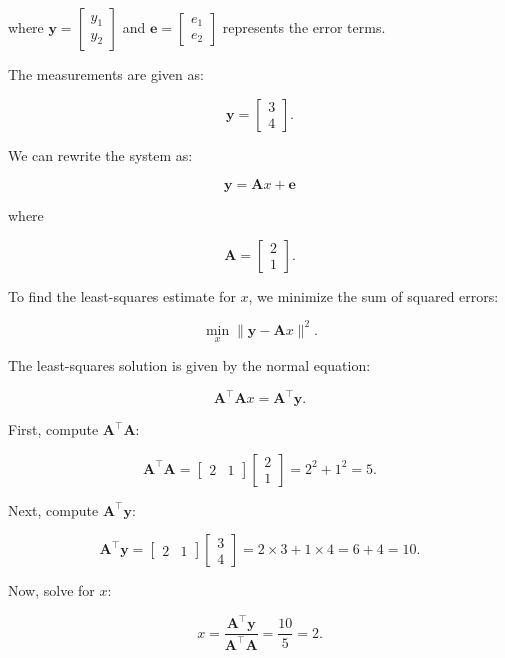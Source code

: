 \documentclass{article}
\begin{document}
where \( \mathbf{y} = \begin{bmatrix} y_1 \\ y_2 \end{bmatrix} \) and \( \mathbf{e} = \begin{bmatrix} e_1 \\ e_2 \end{bmatrix} \) represents the error terms.

The measurements are given as:

\[
\mathbf{y} = \begin{bmatrix} 3 \\ 4 \end{bmatrix}.
\]

We can rewrite the system as:

\[
\mathbf{y} = \mathbf{A} x + \mathbf{e}
\]

where

\[
\mathbf{A} = \begin{bmatrix} 2 \\ 1 \end{bmatrix}.
\]

To find the least-squares estimate for \( x \), we minimize the sum of squared errors:

\[
\min_x \|\mathbf{y} - \mathbf{A}x\|^2.
\]

The least-squares solution is given by the normal equation:

\[
\mathbf{A}^\top \mathbf{A} x = \mathbf{A}^\top \mathbf{y}.
\]

First, compute \( \mathbf{A}^\top \mathbf{A} \):

\[
\mathbf{A}^\top \mathbf{A} = \begin{bmatrix} 2 & 1 \end{bmatrix} \begin{bmatrix} 2 \\ 1 \end{bmatrix} = 2^2 + 1^2 = 5.
\]

Next, compute \( \mathbf{A}^\top \mathbf{y} \):

\[
\mathbf{A}^\top \mathbf{y} = \begin{bmatrix} 2 & 1 \end{bmatrix} \begin{bmatrix} 3 \\ 4 \end{bmatrix} = 2 \times 3 + 1 \times 4 = 6 + 4 = 10.
\]

Now, solve for \( x \):

\[
x = \frac{\mathbf{A}^\top \mathbf{y}}{\mathbf{A}^\top \mathbf{A}} = \frac{10}{5} = 2.
\]
\end{document}
